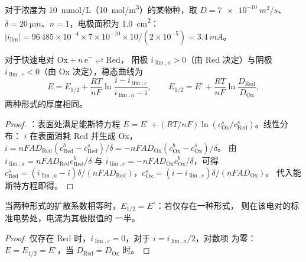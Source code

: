 \begin{example}[极限电流的大小]\label{ex:b2:current-potential-curves:ilim}
对于浓度为 \qty{10}{mmol/L}（\qty{10}{mol/m^3}）的某物种，取 $D =
\qty{7e-10}{m^2/s}$、$\delta = \qty{20}{\micro m}$、$n = 1$，电极面积为
\qty{1.0}{cm^2}：$|i_{\lim}| = 96\,485 \times 10^{-4} \times 7 \times 10^{-10}
\times 10/(2 \times 10^{-5}) = \qty{3.4}{mA}$。
\end{example}

\begin{theorem}[快速体系的波]\label{thm:b2:current-potential-curves:wave}
对于快速电对 $\mathrm{Ox} + n\,\mathrm e^- \rightleftharpoons \mathrm{Red}$，
阳极 $i_{\lim,a} > 0$（由 Red 决定）与阴极
 $i_{\lim,c} < 0$（由 Ox 决定），稳态曲线为
\[
  E = E_{1/2} + \frac{RT}{nF}\ln\frac{i - i_{\lim,c}}{i_{\lim,a} - i},
  \qquad E_{1/2} = E^\circ + \frac{RT}{nF}\ln\frac{D_{\text{Red}}}{D_{\text{Ox}}} ,
\]
两种形式的厚度相同。
\end{theorem}

\begin{proof}
：表面处满足能斯特方程 $E = E^\circ + (RT/nF)
\ln(c^s_{\text{Ox}}/c^s_{\text{Red}})$。线性分布： $i$
在表面消耗 Red 并生成 Ox，$i = nFAD_{\text{Red}}(c^b_{\text{Red}}
- c^s_{\text{Red}})/\delta = -nFAD_{\text{Ox}}(c^b_{\text{Ox}} - c^s_{\text{Ox}})/\delta$。
由 $i_{\lim,a} = nFAD_{\text{Red}}c^b_{\text{Red}}/\delta$ 与 $i_{\lim,c} =
-nFAD_{\text{Ox}}c^b_{\text{Ox}}/\delta$，可得 $c^s_{\text{Red}} = (i_{\lim,a} -
i)\delta/(nFAD_{\text{Red}})$，$c^s_{\text{Ox}} = (i - i_{\lim,c})\delta/(nFAD_{\text{Ox}})$。
代入能斯特方程即得。
\end{proof}

\begin{corollary}[半波电势]\label{cor:b2:current-potential-curves:half-wave}
当两种形式的扩散系数相等时，$E_{1/2} = E^\circ$：若仅存在一种形式，
则在该电对的标准电势处，电流为其极限值的
一半。
\end{corollary}

\begin{proof}
仅存在 Red 时，$i_{\lim,c} = 0$，对于 $i = i_{\lim,a}/2$，对数项
为零：$E = E_{1/2} = E^\circ$，当 $D_{\text{Red}} = D_{\text{Ox}}$ 时。
\end{proof}


